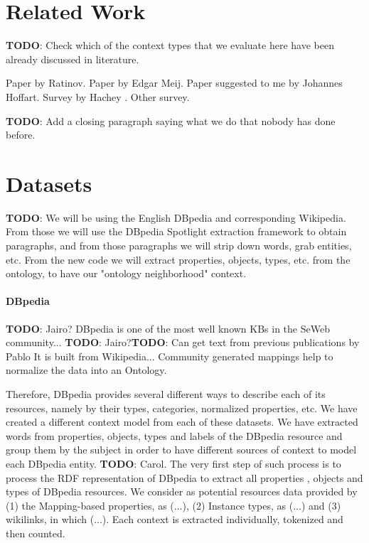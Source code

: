 \documentclass[10pt,a4paper]{article}
\newcommand{\todo}[1]{{\color{red}\textsf{\textbf{TODO}}: #1}}
\begin{document}
\section{Related Work}

\todo{Check which of the context types that we evaluate here have been already discussed in literature.}

Paper by Ratinov. \cite{acl11ratinov}
Paper by Edgar Meij. \cite{wsdm12meij}
Paper suggested to me by Johannes Hoffart.
Survey by Hachey \cite{aij13hachey}.
Other survey.

\todo{Add a closing paragraph saying what we do that nobody has done before.}

\section{Datasets}
\todo{We will be using the English DBpedia and corresponding Wikipedia. From those we will use the DBpedia Spotlight extraction framework to obtain paragraphs, and from those paragraphs we will strip down words, grab entities, etc. From the new code we will extract properties, objects, types, etc. from the ontology, to have our "ontology neighborhood" context.}

\paragraph{DBpedia}\todo{Jairo?}
DBpedia \cite{swj13dbpedia} is one of the most well known KBs in the SeWeb community... \todo{Jairo?}\todo{Can get text from previous publications by Pablo}
It is built from Wikipedia...
Community generated mappings help to normalize the data into an Ontology.

Therefore, DBpedia provides several different ways to describe each of its resources, namely by their types, categories, normalized properties, etc.
We have created a different context model from each of these datasets.
We have extracted words from properties, objects, types and labels of the DBpedia resource and group them by the subject in order to have  different sources of context to model each DBpedia entity. \todo{Carol}.
The very first step of such process is to process the RDF representation of DBpedia to extract all properties , objects and types of DBpedia resources. We consider as potential resources data provided by (1) the Mapping-based properties, as (...), (2) Instance types, as (...) and (3) wikilinks, in which (...). Each context is extracted individually, tokenized and then counted. 
\end{document}
